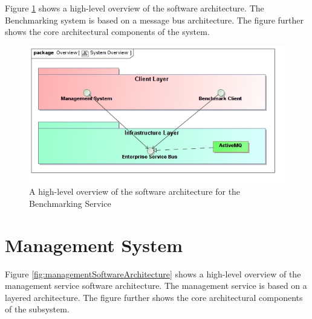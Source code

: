 Figure \ref{fig:softwareArchitecture} shows a high-level overview of the 
software architecture. The Benchmarking system is based on a message bus 
architecture. The figure further shows the core architectural components of
the system.

\begin{figure}[H]
  \begin{center}
  \includegraphics[scale=0.4]{../Diagrams and Charts/Overview/SystemOverview.jpg}
  \caption{A high-level overview of the software architecture for the Benchmarking Service}
  \label{fig:softwareArchitecture}
  \end{center}
\end{figure}

\section{Management System}
Figure \ref{fig:managementSoftwareArchitecture} shows a high-level overview of
the management service software architecture. The management service is based
on a layered architecture. The figure further shows the core architectural
components of the subsystem.

